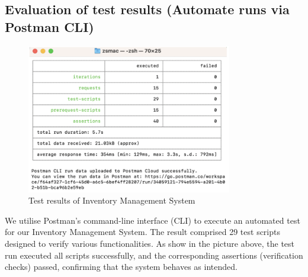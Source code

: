 \subsection{Evaluation of test results (Automate runs via Postman CLI)}
\begin{figure}[h]
    \centering
    \includegraphics[width=0.8\textwidth]{images/testing2}
    \caption{Test results of Inventory Management System}
    \label{fig:testresults-postman-all}
\end{figure}
We utilise Postman’s command-line interface (CLI) to execute an automated test for our Inventory Management System. The result comprised 29 test scripts designed to verify various functionalities. As show in the picture above, the test run executed all scripts successfully, and the corresponding assertions (verification checks) passed, confirming that the system behaves as intended.